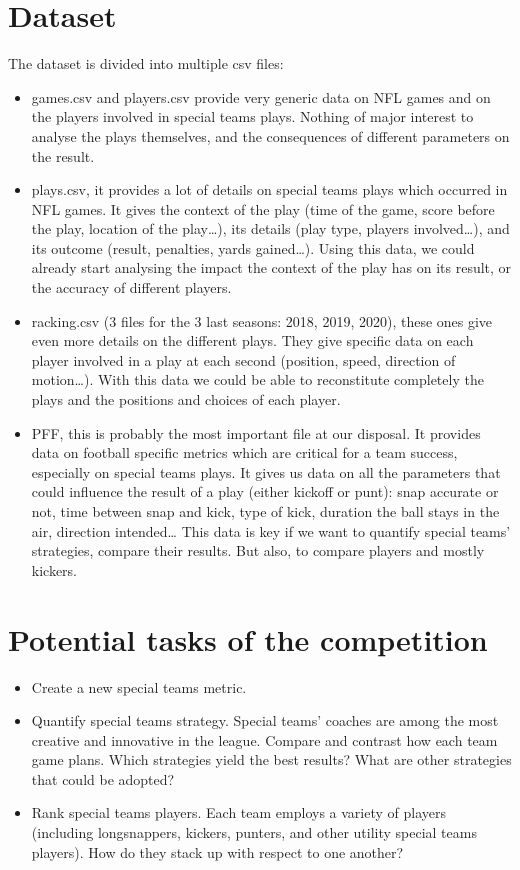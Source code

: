 \documentclass{article}
\begin{document}
\section{Dataset}
The dataset is divided into multiple csv files:
\begin{itemize}
\item games.csv and players.csv provide very generic data on NFL games and on the players involved in special teams plays. Nothing of major interest to analyse the plays themselves, and the consequences of different parameters on the result.
\item plays.csv, it provides a lot of details on special teams plays which occurred in NFL games. It gives the context of the play (time of the game, score before the play, location of the play…), its details (play type, players involved…), and its outcome (result, penalties, yards gained…). Using this data, we could already start analysing the impact the context of the play has on its result, or the accuracy of different players.
\item racking.csv (3 files for the 3 last seasons: 2018, 2019, 2020), these ones give even more details on the different plays. They give specific data on each player involved in a play at each second (position, speed, direction of motion…). With this data we could be able to reconstitute completely the plays and the positions and choices of each player. 
\item PFF, this is probably the most important file at our disposal. It provides data on football specific metrics which are critical for a team success, especially on special teams plays. It gives us data on all the parameters that could influence the result of a play (either kickoff or punt): snap accurate or not, time between snap and kick, type of kick, duration the ball stays in the air, direction intended… This data is key if we want to quantify special teams’ strategies, compare their results. But also, to compare players and mostly kickers.
\end{itemize}
\section{Potential tasks of the competition}
\begin{itemize}
\item Create a new special teams metric.
\item Quantify special teams strategy. Special teams’ coaches are among the most creative and innovative in the league. Compare and contrast how each team game plans. Which strategies yield the best results? What are other strategies that could be adopted?
\item Rank special teams players. Each team employs a variety of players (including longsnappers, kickers, punters, and other utility special teams players). How do they stack up with respect to one another?
\end{itemize}
\end{document}
